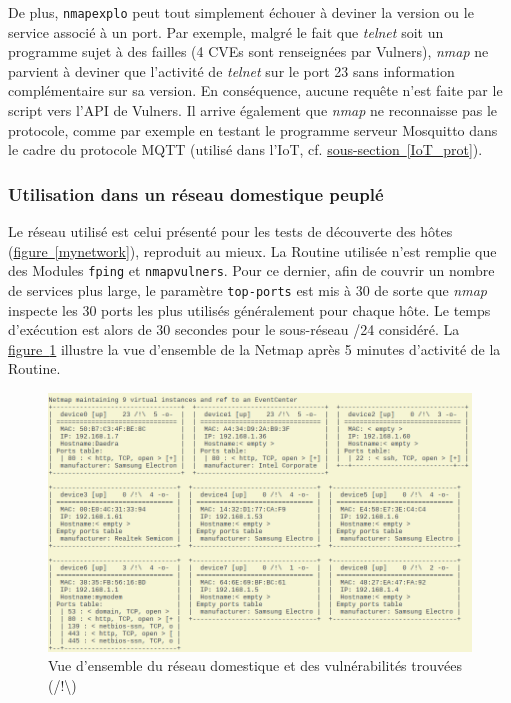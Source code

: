 \documentclass[]{article}
\newcommand{\wordlink}[2]{\hyperref[#1]{#2~\ref{#1}}}
\begin{document}
\par De plus, \texttt{nmapexplo} peut tout simplement échouer à deviner la version ou le service associé à un port. Par exemple, malgré le fait que \textit{telnet} soit un programme sujet à des failles (4 CVEs sont renseignées par Vulners), \textit{nmap} ne parvient à deviner que l'activité de \textit{telnet} sur le port 23 sans information complémentaire sur sa version. En conséquence, aucune requête n'est faite par le script vers l'API de Vulners. Il arrive également que \textit{nmap} ne reconnaisse pas le protocole, comme par exemple en testant le programme serveur Mosquitto dans le cadre du protocole MQTT (utilisé dans l'IoT, cf. \wordlink{IoT_prot}{sous-section}).

\subsubsection{Utilisation dans un réseau domestique peuplé}

Le réseau utilisé est celui présenté pour les tests de découverte des hôtes (\wordlink{mynetwork}{figure}), reproduit au mieux. La Routine utilisée n'est remplie que des Modules \texttt{fping} et \texttt{nmapvulners}. Pour ce dernier, afin de couvrir un nombre de services plus large, le paramètre \texttt{top-ports} est mis à 30 de sorte que \textit{nmap} inspecte les 30 ports les plus utilisés généralement pour chaque hôte. Le temps d'exécution est alors de 30 secondes pour le sous-réseau /24 considéré. La \wordlink{realvulns}{figure} illustre la vue d'ensemble de la Netmap après 5 minutes d'activité de la Routine. 

\begin{figure}[!ht]
\centering
     \includegraphics[width=1\linewidth]{netmapvulns}
     \caption{Vue d'ensemble du réseau domestique et des vulnérabilités trouvées (/!\textbackslash)}
     \label{realvulns}
\end{figure}
\end{document}

